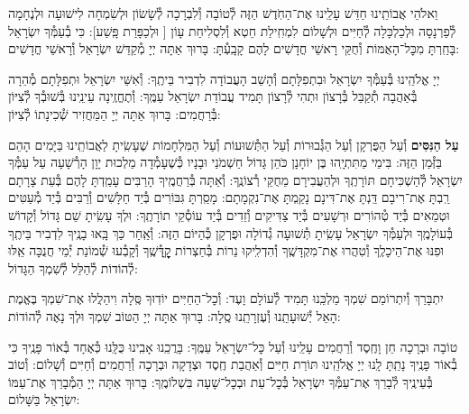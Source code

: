 \documentclass[twoside, openany, parskip=half, 11pt]{book}
\begin{document}
וֵאלֹהֵי אֲבוֹתֵֽינוּ חַדֵּשׁ עָלֵֽינוּ אֶת־הַחֹֽדֶשׁ הַזֶּה לְ֯טוֹבָה וְ֯לִבְרָכָה לְ֯שָׂשׂוֹן וּלְשִׂמְחָה לִישׁוּעָה וּלְנֶחָמָה לְ֯פַרְנָסָה וּלְכַלְכָּלָה לְ֯חַיִּים וּלְשָׁלוֹם לִמְחִֽילַת חֵטְא וְ֯לִסְלִיחַת עָוֹן [
וּלְכַפָּרַת פָּֽשַׁע]: כִּי בְ֯עַמְּ֯ךָ יִשְׂרָאֵל בָּחַֽרְתָּ מִכׇּל־הָאֻמּוֹת וְ֯חֻקֵּי רָאשֵׁי חֳדָשִׁים לָהֶם קָבָֽעְ֯תָּ: בָּרוּךְ אַתָּה יְיָ מְ֯קַדֵּשׁ יִשְׂרָאֵל וְ֯רָאשֵׁי חֳדָשִׁים:

\nextpage
{}
יְיָ אֱלֹהֵֽינוּ בְּ֯עַמְּ֯ךָ יִשְׂרָאֵל וּבִתְפִלָּתָם וְ֯הָשֵׁב הָעֲבוֹדָה לִדְבִיר בֵּיתֶֽךָ: וְ֯אִשֵּׁי יִשְׂרָאֵל וּתְפִלָּתָם מְ֯הֵרָה בְּ֯אַהֲבָה תְ֯קַבֵּל בְּ֯רָצוֹן וּתְהִי לְ֯רָצוֹן תָּמִיד עֲבוֹדַת יִשְׂרָאֵל עַמֶּֽךָ: וְ֯תֶחֱזֶֽינָה עֵינֵֽינוּ בְּ֯שׁוּבְ֯ךָ לְ֯צִיּוֹן בְּ֯רַחֲמִים: בָּרוּךְ אַתָּה יְיָ הַמַּחֲזִיר שְׁ֯כִינָתוֹ לְ֯צִיּוֹן:

\modim

\enlargethispage{\baselineskip}

\begin{sometimes}

\textbf{עַל הַנִּסִּים}
וְ֯עַל הַפֻּרְקָן וְ֯עַל הַגְּ֯בוּרוֹת וְ֯עַל הַתְּ֯שׁוּעוֹת וְ֯עַל הַמִּלְחָמוֹת
שֶׁעָשִֽׂיתָ לַאֲבוֹתֵֽינוּ בַּיָּמִים הָהֵם בַּזְּ֯מַן הַזֶּה:
בִּימֵי מַתִּתְיָֽהוּ בֶּן יוֹחָנָן כֹּהֵן גָּדוֹל חַשְׁמֹנַי וּבָנָיו כְּ֯שֶׁעָמְ֯דָה מַלְכוּת יָוָן הָרְ֯שָׁעָה עַל עַמְּ֯ךָ יִשְׂרָאֵל לְ֯הַשְׁכִּיחָם תּוֹרָתֶֽךָ וּלְהַעֲבִירָם מֵחֻקֵּי רְ֯צוֹנֶֽךָ: וְ֯אַתָּה בְּ֯רַחֲמֶֽיךָ הָרַבִּים עָמַֽדְתָּ לָהֶם בְּ֯עֵת צָרָתָם רַֽבְתָּ אֶת־רִיבָם דַּֽנְתָּ אֶת־דִּינָם נָקַֽמְתָּ אֶת־נִקְמָתָם: מָסַֽרְתָּ גִּבּוֹרִים בְּ֯יַד חַלָּשִׁים וְ֯רַבִּים בְּ֯יַד מְ֯עַטִּים וּטְמֵאִים בְּ֯יַד טְ֯הוֹרִים וּרְשָׁעִים בְּ֯יַד צַדִּיקִים וְ֯זֵדִים בְּ֯יַד עוֹסְ֯קֵי תוֹרָתֶֽךָ: וּלְךָ עָשִֽׂיתָ שֵׁם גָּדוֹל וְ֯קָדוֹשׁ בְּ֯עוֹלָמֶֽךָ וּלְעַמְּ֯ךָ יִשְׂרָאֵל עָשִֽׂיתָ תְּ֯שׁוּעָה גְ֯דוֹלָה וּפֻרְקָן כְּ֯הַיּוֹם הַזֶּה: וְ֯אַֽחַר כַּךְ בָּֽאוּ בָנֶֽיךָ לִדְבִיר בֵּיתֶֽךָ וּפִנּוּ אֶת־הֵיכָלֶֽךָ וְ֯טִהֲרוּ אֶת־מִקְדָּשֶֽׁךָ וְ֯הִדְלִֽיקוּ נֵרוֹת בְּ֯חַצְרוֹת קׇׇׇׇׇׇׇׇׇׇׇׇׇׇדְּ֯שֶֽׁךָ וְ֯קָבְ֯עוּ שְׁ֯מוֹנַת יְ֯מֵי חֲנֻכָּה אֵֽלּוּ לְ֯הוֹדוֹת לְ֯הַלֵּל לְ֯שִׁמְךָ הַגָּדוֹל:

\end{sometimes}

\nextpage

יִתְבָּרַךְ וְ֯יִתְרוֹמַם שִׁמְךָ מַלְכֵּֽנוּ תָּמִיד לְ֯עוֹלָם וָעֶד:
וְ֯כׇל־הַחַיִּים יוֹדֽוּךָ סֶּֽלָה וִיהַלֲלוּ אֶת־שִׁמְךָ בֶּאֱמֶת הָאֵל יְ֯שׁוּעָתֵֽנוּ וְ֯עֶזְרָתֵֽנוּ סֶֽלָה: בָּרוּךְ אַתָּה יְיָ הַטּוֹב שִׁמְךָ וּלְךָ נָאֶה לְ֯הוֹדוֹת:


טוֹבָה וּבְרָכָה חֵן וָחֶֽסֶד וְ֯רַחֲמִים עָלֵֽינוּ וְ֯עַל כׇּל־יִשְׂרָאֵל עַמֶּֽךָ: בָּרֲכֵֽנוּ אָבִֽינוּ כֻּלָּֽנוּ כְּ֯אֶחָד בְּ֯אוֹר פָּנֶֽיךָ כִּי בְ֯אוֹר פָּנֶֽיךָ נָתַֽתָּ לָֽנוּ יְיָ אֱלֹהֵֽינוּ תּוֹרַת חַיִּים וְ֯אַהֲבַת חֶֽסֶד וּצְדָקָה וּבְרָכָה וְ֯רַחֲמִים וְ֯חַיִּים וְ֯שָׁלוֹם: וְ֯טוֹב בְּ֯עֵינֶֽיךָ לְ֯בָרֵךְ אֶת־עַמְּ֯ךָ יִשְׂרָאֵל בְּ֯כׇל־עֵת וּבְכׇל־שָׁעָה בִּשְׁלוֹמֶֽךָ: בָּרוּךְ אַתָּה יְיָ הַמְ֯בָרֵךְ אֶת־עַמּוֹ יִשְׂרָאֵל בַּשָּׁלוֹם:
\end{document}
